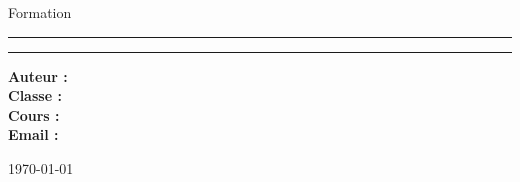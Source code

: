 \begin{titlepage}
	\thispagestyle{empty}
	\centering


	{\Large \textbf{\mySchool} \par}
	\vspace{0.5cm}
	{\large Formation \mySubjectStudies \par}
	\vspace{2cm}

	{\Huge \textbf{\docName} \par}
	\vspace{1cm}

	\rule{\textwidth}{0.8pt}
	\vspace{0.5cm}

	{\huge \textbf{\myTitle} \par}
	\vspace{0.5cm}

	\rule{\textwidth}{0.8pt}
	\vspace{2cm}

	\begin{flushleft}
		\large
		\textbf{Auteur :} \myAuthor \\
		\textbf{Classe :} \myClass \\
		\textbf{Cours :} \myLesson \\
		\textbf{Email :} \myEmail
	\end{flushleft}

	\vfill

	{\large \today \par}

\end{titlepage}